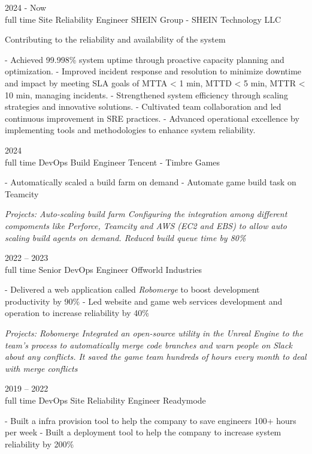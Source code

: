 \documentclass[9pt]{developercv} %
\begin{document}
\begin{entrylist}
	\entry
		{2024 - Now\\\footnotesize{full time}}
		{Site Reliability Engineer}
		{SHEIN Group - SHEIN Technology LLC}
		{
            Contributing to the reliability and availability of the system \newline

            - Achieved 99.998\% system uptime through proactive capacity planning and optimization. \newline
            - Improved incident response and resolution to minimize downtime and impact by meeting SLA goals of MTTA < 1 min, MTTD < 5 min, MTTR < 10 min, managing incidents. \newline
            - Strengthened system efficiency through scaling strategies and innovative solutions. \newline
            - Cultivated team collaboration and led continuous improvement in SRE practices. \newline
            - Advanced operational excellence by implementing tools and methodologies to enhance system reliability. \newline
        }
	\entry
		{2024\\\footnotesize{full time}}
		{DevOps Build Engineer}
		{Tencent - Timbre Games}
		{
            - Automatically scaled a build farm on demand \newline
            - Automate game build task on Teamcity\newline

            \textit{Projects: Auto-scaling build farm\newline
            Configuring the integration among different compoments like Perforce, Teamcity and AWS (EC2 and EBS) to allow 
            auto scaling build agents on demand. Reduced build queue time by 80\%\newline}
        }
	\entry
		{2022 -- 2023\\\footnotesize{full time}}
		{Senior DevOps Engineer}
		{Offworld Industries}
		{
            - Delivered a web application called \textit{Robomerge} to boost development productivity by 90\%\newline
            - Led website and game web services development and operation to increase reliability by 40\%\newline

            \textit{Projects: Robomerge\newline
            Integrated an open-source utility in the Unreal Engine to the team’s process to automatically merge code branches and warn people on Slack about any conflicts. It saved the game team hundreds of hours every month to deal with merge conflicts\newline}
        }
    \entry
		{2019 -- 2022\\\footnotesize{full time}}
		{DevOps Site Reliability Engineer}
		{Readymode}
		{
            - Built a infra provision tool to help the company to save engineers 100+ hours per week\newline
            - Built a deployment tool to help the company to increase system reliability by 200\%\newline

}
\end{entrylist}
\end{document}
